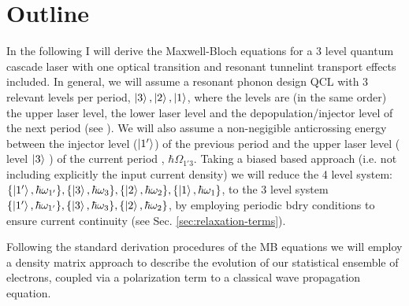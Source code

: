 \documentclass[10pt,english,fleqn]{article}%
\begin{document}
\section{Outline}
\label{sec:outline}
In the following I will derive the Maxwell-Bloch equations for a 3 level quantum cascade laser with one optical transition and resonant tunnelint transport 
effects included. In general, we will assume a resonant phonon design QCL with 3 relevant levels per period, $\Ket{3} , \Ket{2}, \Ket{1}$, where the levels are (in the same order) 
the upper laser level, the lower laser level and the depopulation/injector level of the next period (see \cite{kumar2009}). We will also assume a non-negigible 
anticrossing energy between the injector level ($\Ket{1'}$) of the previous period and the upper laser level ( level $\Ket{3}$ ) of the current period
, $\hbar \Omega_{1'3}$. Taking a biased based approach (i.e. not including explicitly the input current density) we will reduce the 4 level system: 
$\{\Ket{1'}, \hbar \omega_{1'} \} ,\{\Ket{3}, \hbar \omega_{3} \} ,\{\Ket{2}, \hbar \omega_{2} \} ,\{\Ket{1}, \hbar \omega_{1} \}$, to the 3 level system 
$\{\Ket{1'}, \hbar \omega_{1'} \} ,\{\Ket{3}, \hbar \omega_{3} \} ,\{\Ket{2}, \hbar \omega_{2} \}$, by employing periodic bdry conditions to 
ensure current continuity (see Sec. \ref{sec:relaxation-terms}). 

Following the standard derivation procedures of the MB equations we will employ a density matrix approach to describe the evolution of our statistical ensemble 
of electrons, coupled via a polarization term to a classical wave propagation equation. 
\end{document}
